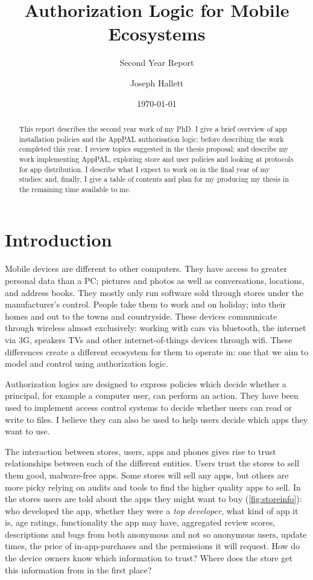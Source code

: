 \documentclass[a4paper]{scrartcl}
\title{Authorization Logic for Mobile Ecosystems}
\subtitle{Second Year Report}
\author{Joseph Hallett}
\date\today
\begin{document}
\maketitle

\begin{abstract}
  This report describes the second year work of my PhD.
  I give a brief overview of app installation policies and the AppPAL authorisation logic; before describing the work completed this year.
  I review topics suggested in the thesis proposal; and describe my work implementing AppPAL, exploring store and user policies and looking at protocols for app distribution.
  I describe what I expect to work on in the final year of my studies; and, finally, I give a table of contents and plan for my producing my thesis in the remaining time available to me.
\end{abstract}

\section{Introduction}

Mobile devices are different to other computers.
They have access to greater personal data than a PC; pictures and photos as well as conversations, locations, and address books.
They mostly only run software sold through stores under the manufacturer's control.
People take them to work and on holiday; into their homes and out to the towns and countryside.
These devices communicate through wireless almost exclusively: working with cars via bluetooth, the internet via 3G, speakers TVs and other internet-of-things devices through wifi.
These differences create a different ecosystem for them to operate in: one that we aim to model and control using authorization logic.

Authorization logics are designed to express policies which decide whether a principal, for example a computer user, can perform an action.
They have been used to implement access control systems to decide whether users can read or write to files.
I believe they can also be used to help users decide which apps they want to use.

The interaction between stores, users, apps and phones gives rise to trust relationships between each of the different entities.
Users trust the stores to sell them good, malware-free apps.
Some stores will sell any apps, but others are more picky relying on audits and tools to find the higher quality apps to sell.
In the stores users are told about the apps they might want to buy (\autoref{fig:storeinfo}):
who developed the app, whether they were a \emph{top developer}, what kind of app it is, age ratings, functionality the app may have, aggregated review scores, descriptions and bugs from both anonymous and not so anonymous users, update times, the price of in-app-purchases and the permissions it will request.
How do the device owners know which information to trust?
Where does the store get this information from in the first place?
\end{document}
